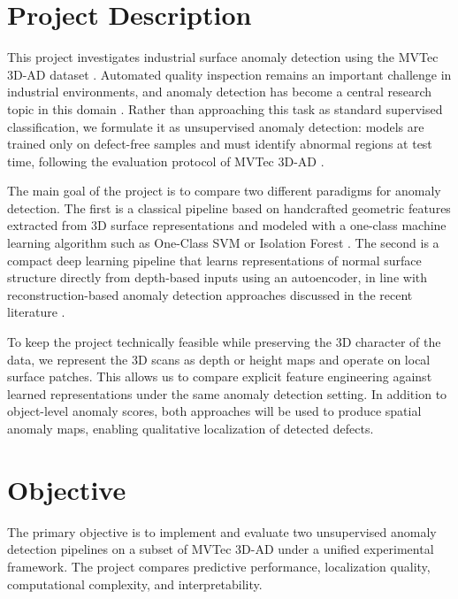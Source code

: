 \section{Project Description}

This project investigates industrial surface anomaly detection using the MVTec 3D-AD dataset \cite{bergmann2022mvtec3d}. Automated quality inspection remains an important challenge in industrial environments, and anomaly detection has become a central research topic in this domain \cite{bergmann2019mvtec,li2025surveyindustrialad}. Rather than approaching this task as standard supervised classification, we formulate it as unsupervised anomaly detection: models are trained only on defect-free samples and must identify abnormal regions at test time, following the evaluation protocol of MVTec 3D-AD \cite{bergmann2022mvtec3d}.

The main goal of the project is to compare two different paradigms for anomaly detection. The first is a classical pipeline based on handcrafted geometric features extracted from 3D surface representations and modeled with a one-class machine learning algorithm such as One-Class SVM \cite{scholkopf2001estimating} or Isolation Forest \cite{liu2008isolation}. The second is a compact deep learning pipeline that learns representations of normal surface structure directly from depth-based inputs using an autoencoder, in line with reconstruction-based anomaly detection approaches discussed in the recent literature \cite{li2025surveyindustrialad}.

To keep the project technically feasible while preserving the 3D character of the data, we represent the 3D scans as depth or height maps and operate on local surface patches. This allows us to compare explicit feature engineering against learned representations under the same anomaly detection setting. In addition to object-level anomaly scores, both approaches will be used to produce spatial anomaly maps, enabling qualitative localization of detected defects.

\section{Objective}

The primary objective is to implement and evaluate two unsupervised anomaly detection pipelines on a subset of MVTec 3D-AD under a unified experimental framework. The project compares predictive performance, localization quality, computational complexity, and interpretability.

